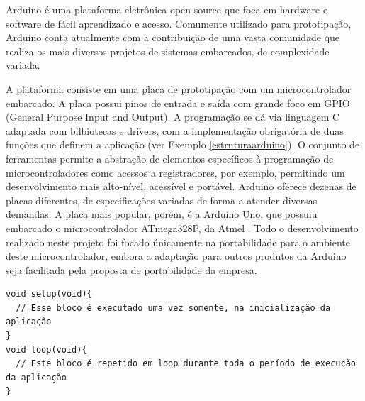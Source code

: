 \documentclass{article}
\begin{document}
\tab Arduino é uma plataforma eletrônica open-source que foca em hardware e software de fácil aprendizado e acesso. Comumente utilizado para prototipação, Arduino conta atualmente com a contribuição de uma vasta comunidade que realiza os mais diversos projetos de sistemas-embarcados, de complexidade variada. \cite{arduinoblog}
\par A plataforma consiste em uma placa de prototipação com um microcontrolador embarcado. A placa possui pinos de entrada e saída com grande foco em GPIO (General Purpose Input and Output). A programação se dá via linguagem C adaptada com bilbiotecas e drivers, com a implementação obrigatória de duas funções que definem a aplicação (ver Exemplo \ref{estruturaarduino}). O conjunto de ferramentas permite a abstração de elementos específicos à programação de microcontroladores como acessos a registradores, por exemplo, permitindo um desenvolvimento mais alto-nível, acessível e portável. Arduino oferece dezenas de placas diferentes, de especificações variadas de forma a atender diversas demandas. A placa mais popular, porém, é a Arduino Uno, que possuiu embarcado o microcontrolador ATmega328P, da Atmel \cite{atmegadatasheet}. Todo o desenvolvimento realizado neste projeto foi focado únicamente na portabilidade para o ambiente deste microcontrolador, embora a adaptação para outros produtos da Arduino seja facilitada pela proposta de portabilidade da empresa.
\begin{lstlisting}[style=CStyle,label=estruturaarduino,caption=Estrutura de uma aplicação Arduino]
void setup(void){
  // Esse bloco é executado uma vez somente, na inicialização da aplicação
}
void loop(void){
  // Este bloco é repetido em loop durante toda o período de execução da aplicação
}
\end{lstlisting}
\end{document}
